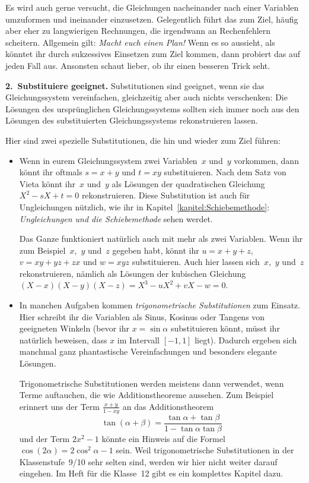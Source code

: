 Es wird auch gerne versucht, die Gleichungen nacheinander nach einer Variablen umzuformen und ineinander einzusetzen. Gelegentlich führt das zum Ziel, häufig aber eher zu langwierigen Rechnungen, die irgendwann an Rechenfehlern scheitern. Allgemein gilt: \emph{Macht euch einen Plan!} Wenn es so aussieht, als könntet ihr durch sukzessives Einsetzen zum Ziel kommen, dann probiert das auf jeden Fall aus. Ansonsten schaut lieber, ob ihr einen besseren Trick seht.

\textbf{2.~Substituiere geeignet.} Substitutionen sind geeignet, wenn sie das Gleichungssystem vereinfachen, gleichzeitig aber auch nichts verschenken: Die Lösungen des ursprünglichen Gleichungssystems sollten sich immer noch aus den Lösungen des substituierten Gleichungssystems rekonstruieren lassen.

Hier sind zwei spezielle Substitutionen, die hin und wieder zum Ziel führen:
\begin{itemize}
	\item Wenn in eurem Gleichungssystem zwei Variablen~$x$ und~$y$ vorkommen, dann könnt ihr oftmals $s=x+y$ und $t=xy$ substituieren. Nach dem Satz von Vieta könnt ihr~$x$ und~$y$ als Lösungen der quadratischen Gleichung $X^2-sX+t=0$ rekonstruieren. Diese Substitution ist auch für Ungleichungen nützlich, wie ihr in Kapitel~\ref{kapitel:Schiebemethode}: \emph{Ungleichungen und die Schiebemethode} sehen werdet.
	
	Das Ganze funktioniert natürlich auch mit mehr als zwei Variablen. Wenn ihr zum Beispiel~$x$,~$y$ und~$z$ gegeben habt, könnt ihr $u=x+y+z$, $v=xy+yz+zx$ und $w=xyz$ substituieren. Auch hier lassen sich~$x$,~$y$ und~$z$ rekonstruieren, nämlich als Lösungen der kubischen Gleichung $(X-x)(X-y)(X-z)=X^3-uX^2+vX-w=0$.
	
	\item In manchen Aufgaben kommen \emph{trigonometrische Substitutionen} zum Einsatz. Hier schreibt ihr die Variablen als Sinus, Kosinus oder Tangens von geeigneten Winkeln (bevor ihr $x=\sin\alpha$ substituieren könnt, müsst ihr natürlich beweisen, dass $x$ im Intervall $[-1,1]$ liegt). Dadurch ergeben sich manchmal ganz phantastische Vereinfachungen und besonders elegante Lösungen.
	
	Trigonometrische Substitutionen werden meistens dann verwendet, wenn Terme auftauchen, die wie Additionstheoreme aussehen. Zum Beispiel erinnert uns der Term $\frac{x+y}{1-xy}$ an das Additionstheorem 
	\begin{equation*}
		\tan(\alpha+\beta)=\frac{\tan\alpha+\tan\beta}{1-\tan\alpha\tan\beta}
	\end{equation*}
	und der Term $2x^2-1$ könnte ein Hinweis auf die Formel $\cos(2\alpha)=2\cos^2\alpha-1$ sein. Weil trigonometrische Substitutionen in der Klassenstufe~9/10 sehr selten sind, werden wir hier nicht weiter darauf eingehen. Im Heft für die Klasse~12 gibt es ein komplettes Kapitel dazu.
\end{itemize}

